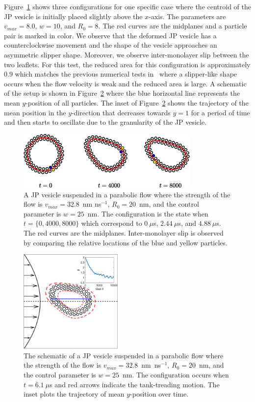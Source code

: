 \documentclass[lineno]{jfm}
\begin{document}
Figure~\ref{figure6} shows three configurations for one specific case
where the centroid of the JP vesicle is initially placed slightly
above the $x$-axis. The parameters are $v_{max} = 8.0$, $w=10$, and
$R_0=8$. The red curves are the midplanes and a particle pair is marked
in color. We observe that the deformed JP vesicle has a
counterclockwise movement and the shape of the vesicle approaches an
asymmetric slipper shape. Moreover, we observe inter-monolayer slip
between the two leaflets. For this test, the reduced area for this
configuration is approximately $0.9$ which matches the previous
numerical tests in~\cite{Kaoui09} where a slipper-like shape occurs when
the flow velocity is weak and the reduced area is large. A schematic of
the setup is shown in Figure~\ref{figure7} where the blue horizontal
line represents the mean $y$-position of all particles. The inset of
Figure~\ref{figure7} shows the trajectory of the mean position in the
$y$-direction that decreases towards $y=1$ for a period of time and then
starts to oscillate due to the granularity of the JP vesicle. 

\begin{figure}
\centering
\includegraphics[width=0.8\textwidth]{slipper.eps}
  \caption{\label{figure6} A JP vesicle suspended in a parabolic flow
  where the strength of the flow is $v_{max}=32.8$~nm ns$^{-1}$, $R_0 =
  20$~nm, and the control parameter is $w=25$~nm. The configuration is
  the state when $t=\{0, 4000, 8000\}$ which correspond to $0\ \mu $s, $2.44\ \mu $s, and $4.88\ \mu $s. The red curves are the midplanes. Inter-monolayer slip is observed by comparing the relative  locations of the blue and yellow particles.}
\end{figure}


\begin{figure}
\centering
\includegraphics[height=2in]{parabolic.eps}
  \caption{\label{figure7} The schematic of a JP vesicle suspended in a
  parabolic flow where the strength of the flow is
  $v_{max}=32.8$~nm~ns$^{-1}$, $R_0 = 20$~nm, and the control parameter
  is $w=25$~nm. The configuration occurs when $t=6.1\ \mu$s and red arrows indicate the tank-treading motion. The inset plots the trajectory of mean $y$-position over time.}
\end{figure}
\end{document}
